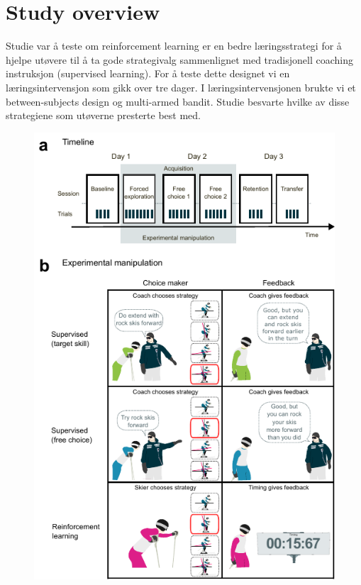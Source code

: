 \section{Study overview}
\newcommand{\RNum}[1]{\uppercase\expandafter{\romannumeral #1\relax}}
Studie \RNum{1} var å teste om reinforcement learning er en bedre læringsstrategi for å hjelpe utøvere til å ta gode strategivalg sammenlignet med tradisjonell coaching instruksjon (supervised learning). For å teste dette designet vi en læringsintervensjon som gikk over tre dager. I læringsintervensjonen brukte vi et between-subjects design og multi-armed bandit.  Studie \RNum{2} besvarte hvilke av disse strategiene som utøverne presterte best med. 


\begin{figure}[H]
\centering
\includegraphics{figure_method_experiment.pdf}

\end{figure}
